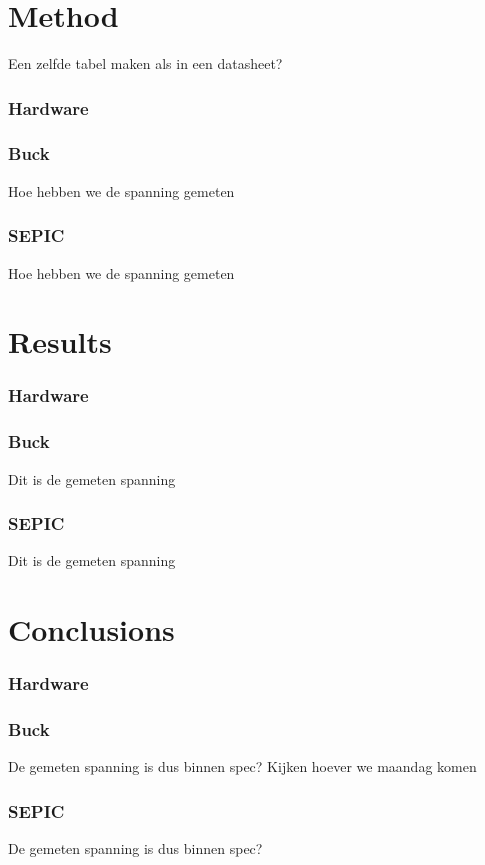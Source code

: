 \section{Method}
Een zelfde tabel maken als in een datasheet?

\subsubsection{Hardware}
\subsubsection{Buck}
Hoe hebben we de spanning gemeten

\subsubsection{SEPIC}
Hoe hebben we de spanning gemeten

\section{Results}

\subsubsection{Hardware}
\subsubsection{Buck}
Dit is de gemeten spanning

\subsubsection{SEPIC}
Dit is de gemeten spanning

\section{Conclusions}

\subsubsection{Hardware}
\subsubsection{Buck}
De gemeten spanning is dus binnen spec? Kijken hoever we maandag komen

\subsubsection{SEPIC}
De gemeten spanning is dus binnen spec?